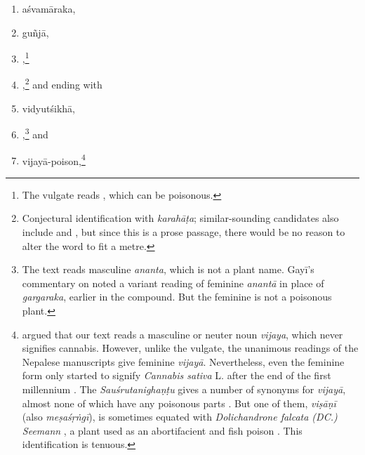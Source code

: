 \begin{translation}
\begin{itemize}
\begin{enumerate}
        \item \gls{aśvamāraka},
    
        \item \gls{guñjā},
        
        \item {},\footnote{The vulgate reads 
      , which can be poisonous.}
        
       \item {},\footnote{Conjectural identification with 
       \emph{karahāṭa}; similar-sounding candidates also include 
        and , but since this is a prose passage, 
       there would be no reason to alter the word to fit a metre.} and ending with 
           
\item \gls{vidyutśikhā},

\item {},\footnote{\label{ananta-poison}The
    text reads masculine \emph{ananta}, which is not a plant name.  Gayī's
    commentary on  noted a variant reading of feminine
    \emph{anantā} in place of \emph{gargaraka}, earlier in the compound.
    But the feminine  is not a poisonous
    plant.} and


\item \gls{vijayā-poison},\footnote{\citet[61, n.\,3]{meul-sear} argued that
    our text reads a masculine or neuter noun \emph{vijaya}, which never
    signifies cannabis. However, unlike the vulgate, the unanimous
    readings of the Nepalese manuscripts give feminine \emph{vijayā}. 
    Nevertheless, even the feminine form only started to signify
    \emph{Cannabis sativa} L. after the end of the first millennium
    \citep{meul-sear,wuja-cann,mchu-2021}. The \emph{Sauśrutanighaṇṭu}
    gives a number of synonyms for \emph{vijayā}, almost none of which
    have any poisonous parts \citep[5.77, 10.143]{suve-2000}.  But one of
    them, \emph{viṣāṇī} (also \emph{meṣaśṛṅgī}), is sometimes equated with
    \emph{Dolichandrone falcata (DC.) Seemann} \citep[518]{adps}, a plant
    used as an abortifacient and fish poison \citep[\#862]{NK}.  This
    identification is tenuous.} %
        \end{enumerate}
        \end{itemize}
    

\end{translation}
